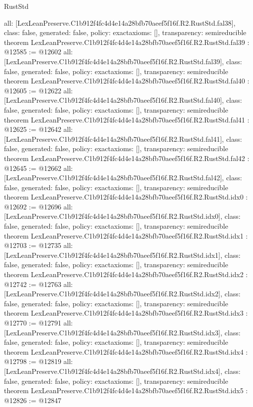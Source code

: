 \begin{lexlean}{RustStd}
\begin{coremodule}
{  all: [LexLeanPreserve.C1b912f4fc4d4e14a28bfb70aeef5f16f.R2.RustStd.fal38],
  class: false,
  generated: false,
  policy: exact{axioms: []},
  transparency: semireducible
}
theorem LexLeanPreserve.C1b912f4fc4d4e14a28bfb70aeef5f16f.R2.RustStd.fal39 : @12585 := @12602 {
  all: [LexLeanPreserve.C1b912f4fc4d4e14a28bfb70aeef5f16f.R2.RustStd.fal39],
  class: false,
  generated: false,
  policy: exact{axioms: []},
  transparency: semireducible
}
theorem LexLeanPreserve.C1b912f4fc4d4e14a28bfb70aeef5f16f.R2.RustStd.fal40 : @12605 := @12622 {
  all: [LexLeanPreserve.C1b912f4fc4d4e14a28bfb70aeef5f16f.R2.RustStd.fal40],
  class: false,
  generated: false,
  policy: exact{axioms: []},
  transparency: semireducible
}
theorem LexLeanPreserve.C1b912f4fc4d4e14a28bfb70aeef5f16f.R2.RustStd.fal41 : @12625 := @12642 {
  all: [LexLeanPreserve.C1b912f4fc4d4e14a28bfb70aeef5f16f.R2.RustStd.fal41],
  class: false,
  generated: false,
  policy: exact{axioms: []},
  transparency: semireducible
}
theorem LexLeanPreserve.C1b912f4fc4d4e14a28bfb70aeef5f16f.R2.RustStd.fal42 : @12645 := @12662 {
  all: [LexLeanPreserve.C1b912f4fc4d4e14a28bfb70aeef5f16f.R2.RustStd.fal42],
  class: false,
  generated: false,
  policy: exact{axioms: []},
  transparency: semireducible
}
theorem LexLeanPreserve.C1b912f4fc4d4e14a28bfb70aeef5f16f.R2.RustStd.idx0 : @12692 := @12696 {
  all: [LexLeanPreserve.C1b912f4fc4d4e14a28bfb70aeef5f16f.R2.RustStd.idx0],
  class: false,
  generated: false,
  policy: exact{axioms: []},
  transparency: semireducible
}
theorem LexLeanPreserve.C1b912f4fc4d4e14a28bfb70aeef5f16f.R2.RustStd.idx1 : @12703 := @12735 {
  all: [LexLeanPreserve.C1b912f4fc4d4e14a28bfb70aeef5f16f.R2.RustStd.idx1],
  class: false,
  generated: false,
  policy: exact{axioms: []},
  transparency: semireducible
}
theorem LexLeanPreserve.C1b912f4fc4d4e14a28bfb70aeef5f16f.R2.RustStd.idx2 : @12742 := @12763 {
  all: [LexLeanPreserve.C1b912f4fc4d4e14a28bfb70aeef5f16f.R2.RustStd.idx2],
  class: false,
  generated: false,
  policy: exact{axioms: []},
  transparency: semireducible
}
theorem LexLeanPreserve.C1b912f4fc4d4e14a28bfb70aeef5f16f.R2.RustStd.idx3 : @12770 := @12791 {
  all: [LexLeanPreserve.C1b912f4fc4d4e14a28bfb70aeef5f16f.R2.RustStd.idx3],
  class: false,
  generated: false,
  policy: exact{axioms: []},
  transparency: semireducible
}
theorem LexLeanPreserve.C1b912f4fc4d4e14a28bfb70aeef5f16f.R2.RustStd.idx4 : @12798 := @12819 {
  all: [LexLeanPreserve.C1b912f4fc4d4e14a28bfb70aeef5f16f.R2.RustStd.idx4],
  class: false,
  generated: false,
  policy: exact{axioms: []},
  transparency: semireducible
}
theorem LexLeanPreserve.C1b912f4fc4d4e14a28bfb70aeef5f16f.R2.RustStd.idx5 : @12826 := @12847 {
}
\end{coremodule}
\end{lexlean}
